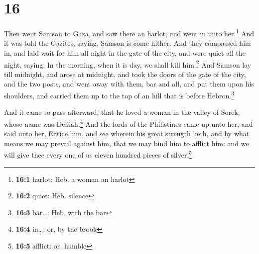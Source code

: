 \hypertarget{section-15}{%
\section{16}\label{section-15}}

 Then went Samson to Gaza, and saw there an harlot, and
went in unto her.\footnote{\textbf{16:1} harlot: Heb. a woman an harlot}
 And it was told the Gazites, saying, Samson is come
hither. And they compassed him in, and laid wait for him all night in
the gate of the city, and were quiet all the night, saying, In the
morning, when it is day, we shall kill him.\footnote{\textbf{16:2}
  quiet: Heb. silence}  And Samson lay till midnight, and
arose at midnight, and took the doors of the gate of the city, and the
two posts, and went away with them, bar and all, and put them upon his
shoulders, and carried them up to the top of an hill that is before
Hebron.\footnote{\textbf{16:3} bar\ldots: Heb. with the bar}

 And it came to pass afterward, that he loved a woman in
the valley of Sorek, whose name was Delilah.\footnote{\textbf{16:4}
  in\ldots: or, by the brook}  And the lords of the
Philistines came up unto her, and said unto her, Entice him, and see
wherein his great strength lieth, and by what means we may prevail
against him, that we may bind him to afflict him: and we will give thee
every one of us eleven hundred pieces of silver.\footnote{\textbf{16:5}
  afflict: or, humble}

